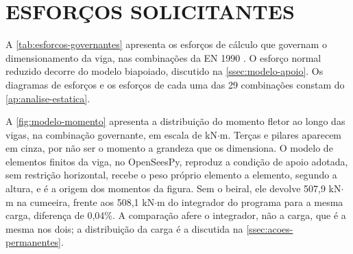 \section{ESFORÇOS SOLICITANTES}\label{sec:esforcos}

A \autoref{tab:esforcos-governantes} apresenta os esforços de cálculo que
governam o dimensionamento da viga, nas combinações da
EN 1990 \cite{EN1990:2002}. O esforço normal reduzido decorre do modelo
biapoiado, discutido na \autoref{ssec:modelo-apoio}. Os diagramas de esforços e
os esforços de cada uma das 29 combinações constam do
\autoref{ap:analise-estatica}.


A \autoref{fig:modelo-momento} apresenta a distribuição do momento fletor ao
longo das vigas, na combinação governante, em escala de kN$\cdot$m. Terças e
pilares aparecem em cinza, por não ser o momento a grandeza que os dimensiona. O
modelo de elementos finitos da viga, no OpenSeesPy, reproduz a condição de apoio
adotada, sem restrição horizontal, recebe o peso próprio elemento a elemento,
segundo a altura, e é a origem dos momentos da figura. Sem o beiral, ele devolve
507,9 kN$\cdot$m na cumeeira, frente aos 508,1 kN$\cdot$m do integrador do programa
para a mesma carga, diferença de 0,04\%. A comparação afere o integrador, não a
carga, que é a mesma nos dois; a distribuição da carga é a discutida na
\autoref{ssec:acoes-permanentes}.

